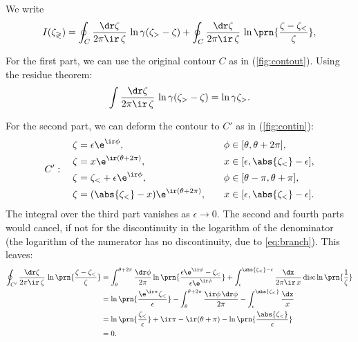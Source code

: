 \documentclass[12pt]{article}
\begin{document}
We write
%
\begin{equation}\label{eq:contoursplit}
  I(\zeta_\gtrless) = \oint_C \frac{\dr\zeta}{2\pi\ir\,\zeta}\, \ln\gamma(\zeta_>-\zeta) + \oint_C \frac{\dr\zeta}{2\pi\ir\,\zeta}\, \ln\prn{\frac{\zeta-\zeta_<}{\zeta}},
\end{equation}
%

For the first part, we can use the original contour $C$ as in (\ref{fig:contout}).
Using the residue theorem:
%
\begin{equation}\label{eq:intout}
  \int \frac{\dr\zeta}{2\pi\ir\,\zeta}\, \ln\gamma(\zeta_>-\zeta) = \ln \gamma\zeta_>.
\end{equation}
%

For the second part, we can deform the contour to $C'$ as in (\ref{fig:contin}):
%
\begin{equation}\label{eq:contout}
C': \quad
  \begin{aligned}
    \zeta &= \epsilon\e^{\ir\phi},                         & \phi &\in [\theta,\theta+2\pi], \\
    \zeta &= x \e^{\ir(\theta+2\pi)},                      & x    &\in [\epsilon,\abs{\zeta_<}-\epsilon], \\
    \zeta &= \zeta_< + \epsilon\e^{\ir\phi},               & \phi &\in [\theta-\pi,\theta+\pi], \\
    \zeta &= (\abs{\zeta_<}-x) \e^{\ir(\theta+2\pi)},\quad & x    &\in [\epsilon,\abs{\zeta_<}-\epsilon]. \\
  \end{aligned}
\end{equation}
%
The integral over the third part vanishes as $\epsilon\to0$. 
The second and fourth parts would cancel, if not for the discontinuity in the logarithm of the denominator
(the logarithm of the numerator has no discontinuity, due to \eqref{eq:branch}).
This leaves:
%
\begin{equation}\label{eq:intin}
\begin{aligned}
  \oint_{C'} \frac{\dr\zeta}{2\pi\ir\,\zeta}\, \ln\prn{\frac{\zeta-\zeta_<}{\zeta}}
    &= \int_{\theta}^{\theta+2\pi}\frac{\dr\phi}{2\pi} \ln\prn{\frac{\epsilon\e^{\ir\phi}-\zeta_<}{\epsilon\e^{\ir\phi}}}
     + \int_{\epsilon}^{\abs{\zeta_<}-\epsilon} \frac{\dx}{2\pi\ir\,x} \operatorname{disc}\ln\prn{\frac{1}{\zeta}}\\
    &= \ln\prn{\frac{\e^{\ir\pi}\zeta_<}{\epsilon}}
     -  \int_{\theta}^{\theta+2\pi} \frac{\ir\phi\,\dr\phi}{2\pi} 
     - \int_{\epsilon}^{\abs{\zeta_<}} \frac{\dx}{x}\\
    &= \ln\prn{\frac{\zeta_<}{\epsilon}} +\ir\pi
     - \ir(\theta+\pi)
     - \ln\prn{\frac{\abs{\zeta_<}}{\epsilon}}\\
    &= 0.
\end{aligned}
\end{equation}
%
\end{document}
